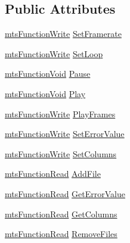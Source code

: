 \subsection*{Public Attributes}
\begin{DoxyCompactItemize}
\item 
\hyperlink{classmts_function_write}{mts\-Function\-Write} \hyperlink{class_i_req_filter_source_text_file_ab2f583e13bb4f0e6019fd749a43efbc7}{Set\-Framerate}
\item 
\hyperlink{classmts_function_write}{mts\-Function\-Write} \hyperlink{class_i_req_filter_source_text_file_a2790141d7cbbd3ff46682e50a558ad6e}{Set\-Loop}
\item 
\hyperlink{classmts_function_void}{mts\-Function\-Void} \hyperlink{class_i_req_filter_source_text_file_a82b790f230892b824fbe402c5b75099b}{Pause}
\item 
\hyperlink{classmts_function_void}{mts\-Function\-Void} \hyperlink{class_i_req_filter_source_text_file_ac79657c22cb873220d37c9f601a0abf6}{Play}
\item 
\hyperlink{classmts_function_write}{mts\-Function\-Write} \hyperlink{class_i_req_filter_source_text_file_a0e25692ad7c4fd99318ad89ec73ab10d}{Play\-Frames}
\item 
\hyperlink{classmts_function_write}{mts\-Function\-Write} \hyperlink{class_i_req_filter_source_text_file_a1bf825ca96ecaba04057138e9ff34a9e}{Set\-Error\-Value}
\item 
\hyperlink{classmts_function_write}{mts\-Function\-Write} \hyperlink{class_i_req_filter_source_text_file_a78889a6dfbb57a0eb6570c66fd8072e6}{Set\-Columns}
\item 
\hyperlink{classmts_function_read}{mts\-Function\-Read} \hyperlink{class_i_req_filter_source_text_file_a20fc10d3d99c9b1ff5b0760d5efa2211}{Add\-File}
\item 
\hyperlink{classmts_function_read}{mts\-Function\-Read} \hyperlink{class_i_req_filter_source_text_file_a5fd360bb1ce42ff97bbcfb7914e3d932}{Get\-Error\-Value}
\item 
\hyperlink{classmts_function_read}{mts\-Function\-Read} \hyperlink{class_i_req_filter_source_text_file_a1824c36d343906140cbf7623ee8a4804}{Get\-Columns}
\item 
\hyperlink{classmts_function_read}{mts\-Function\-Read} \hyperlink{class_i_req_filter_source_text_file_af23d8b705ddd2539be5e5d968c15a5ff}{Remove\-Files}
\end{DoxyCompactItemize}


